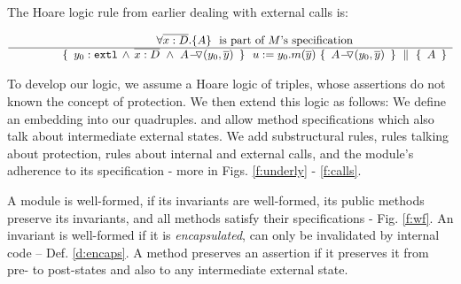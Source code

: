 \vspace{.05cm}

The Hoare logic rule from earlier dealing with external calls is:
 
 $\inferruleNoName  
 	{ 
   	   {\TwoStatesN {\overline {x:D}} {A}}\ \   \mbox{is part of $M$'s specification}
        }
	{   \quadruple { \    { \external{y_0}} \,     \wedge \,  \overline{x:D}\  \wedge\  {\PushASLong {(y_0,\overline y)}{A}} \ }  
						{ \ u:=y_0.m(\overline y)\    }
						{ \   {\PushASLong {(y_0,\overline y)}{A}}  \ }
						{\  A  \ }
         }
$

\vspace{.1cm}

To develop our logic, we     assume a  Hoare logic of  triples, whose assertions do not known the concept of protection.
We then extend this logic as follows: We define an embedding into our quadruples. 
and allow method specifications which also talk about intermediate external states.
We add substructural rules, rules talking about protection,   rules about internal and external calls, 
and the module's adherence to its 
specification - more in Figs. \ref{f:underly} -  \ref{f:calls}. %
 
 \vspace{.1cm}
A module is well-formed, if  its invariants are well-formed,    its public methods preserve   its invariants, and  all  methods satisfy their specifications - \cf  Fig.  \ref{f:wf}.
% 
An invariant is well-formed if %
it is \emph{encapsulated}, \ie can only be invalidated by internal code
-- \cf Def. \ref{d:encaps}. 
% 
A method preserves an assertion   if it preserves it   from pre- to  post-states and also to any intermediate external state.

